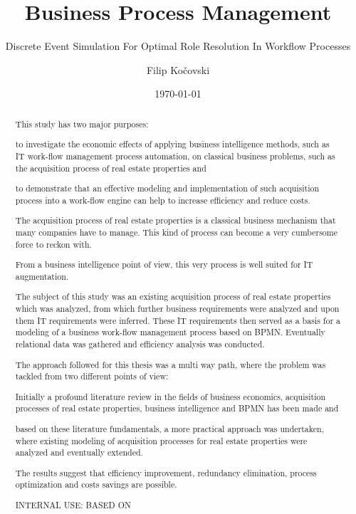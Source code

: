 \documentclass{seal_thesis}
\date{\today}
\title{Business Process Management}
\subtitle{Discrete Event Simulation For Optimal Role Resolution In Workflow Processes}
\author{Filip Ko\v{c}ovski}
\begin{document}
\maketitle

\frontmatter

\begin{acknowledgements}

\end{acknowledgements}

\begin{abstract}
	This study has two major purposes: 
	\begin{enumerate*}[font=\bfseries]
		\item to investigate the economic effects of applying business intelligence methods, such as IT work-flow management process automation, on classical business problems, such as the acquisition process of real estate properties and
		\item to demonstrate that an effective modeling and implementation of such acquisition process into a work-flow engine can help to increase efficiency and reduce costs.
	\end{enumerate*} 

	The acquisition process of real estate properties is a classical business mechanism that many companies have to manage. This kind of process can become a very cumbersome force to reckon with.
	
	From a business intelligence point of view, this very process is well suited for IT augmentation.
	
	The subject of this study was an existing acquisition process of real estate properties which was analyzed, from which further business requirements were analyzed and upon them IT requirements were inferred. These IT requirements then served as a basis for a modeling of a business work-flow management process based on BPMN. Eventually relational data was gathered and efficiency analysis was conducted.
	
	The approach followed for this thesis was a multi way path, where the problem was tackled from two different points of view:
	\begin{enumerate*}[font=\bfseries]
		\item Initially a profound literature review in the fields of business economics, acquisition processes of real estate properties, business intelligence and BPMN has been made and
		\item based on these literature fundamentals, a more practical approach was undertaken, where existing modeling of acquisition processes for real estate properties were analyzed and eventually extended.
	\end{enumerate*} 

	The results suggest that efficiency improvement, redundancy elimination, process optimization and costs savings are possible.
	
	INTERNAL USE: BASED ON \cite{Bond2009}
\end{abstract}
\end{document}
